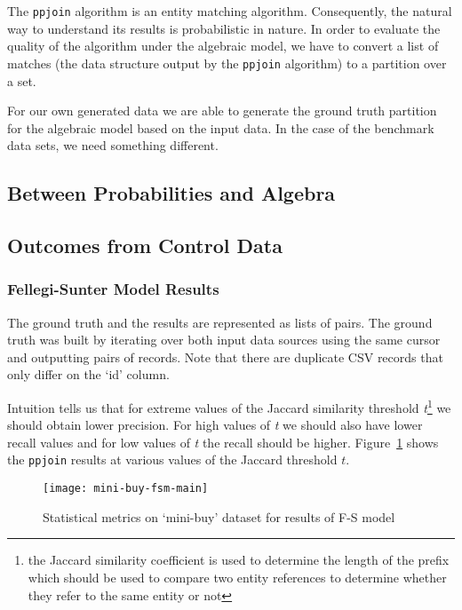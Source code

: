 The \texttt{ppjoin} algorithm is an entity matching algorithm.
Consequently, the natural way to understand its results is probabilistic in
nature.
In order to evaluate the quality of the algorithm under the algebraic model, we
have to convert a list of matches (the data structure output by the
\texttt{ppjoin} algorithm) to a partition over a set.

For our own generated data we are able to generate the ground truth partition
for the algebraic model based on the input data.
In the case of the benchmark data sets, we need something different.

\subsection{Between Probabilities and Algebra}\label{subsec:Probabilities to Algebra}


\subsection{Outcomes from Control Data}\label{subsec:Control Data}

\subsubsection{Fellegi-Sunter Model Results}\label{subsubsec:F-S Results}

The ground truth and the results are represented as lists of pairs.
The ground truth was built by iterating over both input data sources using
the same cursor and outputting pairs of records.
Note that there are duplicate CSV records that only differ on the `id' column.

Intuition tells us that for extreme values of the Jaccard similarity threshold
\textit{t}\footnote[1]{
    the Jaccard similarity coefficient is used to determine the length of the
    prefix which should be used to compare two entity references to determine
    whether they refer to the same entity or not
} we should obtain lower precision.
For high values of \textit{t} we should also have lower recall values and for
low values of \textit{t} the recall should be higher.
Figure~\ref{fig:mini-buy-fs} shows the \texttt{ppjoin} results at various
values of the Jaccard threshold $t$.

\begin{figure}[htbp]
    \centering
    \captionsetup{justification=centering}
    \texttt{[image: mini-buy-fsm-main]}
    \caption{Statistical metrics on `mini-buy' dataset for results of F-S model}\label{fig:mini-buy-fs}
\end{figure}

